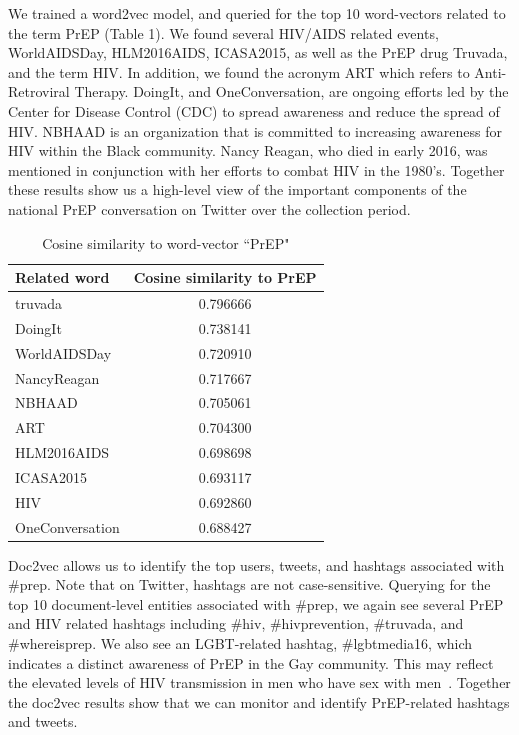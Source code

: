 \documentclass{sig-alternate-05-2015}
\begin{document}
We trained a word2vec model, and queried for the top 10 word-vectors related to the term PrEP (Table 1). We found several HIV/AIDS related events, WorldAIDSDay, HLM2016AIDS, ICASA2015, as well as the PrEP drug Truvada, and the term HIV. In addition, we found the acronym ART which refers to Anti-Retroviral Therapy. DoingIt, and OneConversation, are ongoing efforts led by the Center for Disease Control (CDC) to spread awareness and reduce the spread of HIV. NBHAAD is an organization that is committed to increasing awareness for HIV within the Black community. Nancy Reagan, who died in early 2016, was mentioned in conjunction with her efforts to combat HIV in the 1980's. Together these results show us a high-level view of the important components of the national PrEP conversation on Twitter over the collection period.

\begin{table}
\centering
\caption{Cosine similarity to word-vector ``PrEP"}
\begin{tabular}{|l|c|} \hline
Related word & Cosine similarity to PrEP\\ \hline
truvada & 0.796666\\ \hline
DoingIt & 0.738141\\ \hline
WorldAIDSDay & 0.720910\\ \hline
NancyReagan & 0.717667\\ \hline
NBHAAD & 0.705061\\ \hline
ART & 0.704300\\ \hline
HLM2016AIDS & 0.698698\\ \hline
ICASA2015 & 0.693117\\ \hline
HIV & 0.692860\\ \hline
OneConversation & 0.688427\\ \hline
\hline\end{tabular}
\end{table}

Doc2vec allows us to identify the top users, tweets, and hashtags associated with \#prep. Note that on Twitter, hashtags are not case-sensitive. Querying for the top 10 document-level entities associated with \#prep, we again see several PrEP and HIV related hashtags including \#hiv, \#hivprevention, \#truvada, and \#whereisprep. We also see an LGBT-related hashtag, \#lgbtmedia16, which indicates a distinct awareness of PrEP in the Gay community. This may reflect the elevated levels of HIV transmission in men who have sex with men~\cite{centers2014hiv}. Together the doc2vec results show that we can monitor and identify PrEP-related hashtags and tweets.
\end{document}
